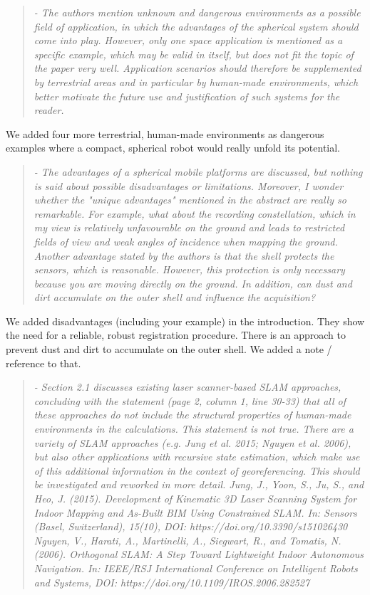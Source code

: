 \documentclass{article}
\newenvironment{itquote}
  {\begin{quote}\itshape}
  {\end{quote}\ignorespacesafterend}
\begin{document}
\begin{itquote}
- The authors mention unknown and dangerous environments as a
possible field of application, in which the advantages of the
spherical system should come into play. However, only one space
application is mentioned as a specific example, which may be valid
in itself, but does not fit the topic of the paper very
well. Application scenarios should therefore be supplemented by
terrestrial areas and in particular by human-made environments,
which better motivate the future use and justification of such
systems for the reader.
\end{itquote}

We added four more terrestrial, human-made environments as dangerous examples where a compact, spherical robot would really unfold its potential.

\begin{itquote} 
- The advantages of a spherical mobile platforms are discussed, but
nothing is said about possible disadvantages or
limitations. Moreover, I wonder whether the "unique advantages"
mentioned in the abstract are really so remarkable. For example,
what about the recording constellation, which in my view is
relatively unfavourable on the ground and leads to restricted fields
of view and weak angles of incidence when mapping the
ground. Another advantage stated by the authors is that the shell
protects the sensors, which is reasonable. However, this protection
is only necessary because you are moving directly on the ground. In
addition, can dust and dirt accumulate on the outer shell and
influence the acquisition?
\end{itquote}

We added disadvantages (including your example) in the introduction. They show the need for a reliable, robust registration procedure.
There is an approach to prevent dust and dirt to accumulate on the outer shell. We added a note / reference to that. 

\begin{itquote}
- Section 2.1 discusses existing laser scanner-based SLAM
approaches, concluding with the statement (page 2, column 1, line
30-33) that all of these approaches do not include the structural
properties of human-made environments in the calculations. This
statement is not true. There are a variety of SLAM approaches
(e.g. Jung et al. 2015; Nguyen et al.  2006), but also other
applications with recursive state estimation, which make use of this
additional information in the context of georeferencing. This should
be investigated and reworked in more detail.
Jung, J., Yoon, S., Ju, S., and Heo, J. (2015). Development of Kinematic
3D Laser Scanning System for Indoor Mapping and As-Built BIM Using
Constrained SLAM. In: Sensors (Basel, Switzerland), 15(10), DOI:
https://doi.org/10.3390/s151026430
Nguyen, V., Harati, A., Martinelli, A., Siegwart, R., and Tomatis, N.
(2006). Orthogonal SLAM: A Step Toward Lightweight Indoor Autonomous
Navigation. In: IEEE/RSJ International Conference on Intelligent Robots
and Systems, DOI: https://doi.org/10.1109/IROS.2006.282527
\end{itquote}
\end{document}
